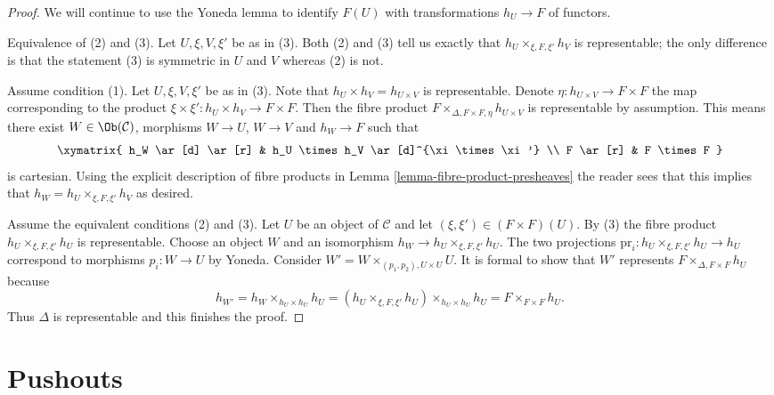 \begin{proof}
We will continue to use the Yoneda lemma to identify $F(U)$
with transformations $h_U \to F$ of functors.

\medskip\noindent
Equivalence of (2) and (3). Let $U, \xi, V, \xi'$ be as in (3).
Both (2) and (3) tell us exactly that $h_U \times_{\xi, F, \xi'} h_V$
is representable; the only difference is that the statement
(3) is symmetric in $U$ and $V$ whereas (2) is not.

\medskip\noindent
Assume condition (1). Let $U, \xi, V, \xi'$
be as in (3). Note that $h_U \times h_V = h_{U \times V}$ is representable.
Denote $\eta : h_{U \times V} \to F \times F$ the map
corresponding to the product $\xi \times \xi' : h_U \times h_V \to F \times F$.
Then the fibre product $F \times_{\Delta, F \times F, \eta} h_{U \times V}$
is representable by assumption. This means there exist
$W \in \Ob(\mathcal{C})$, morphisms
$W \to U$, $W \to V$ and $h_W \to F$ such that
$$
\xymatrix{
h_W \ar[d] \ar[r] & h_U \times h_V \ar[d]^{\xi \times \xi'} \\
F \ar[r] & F \times F
}
$$
is cartesian. Using the explicit description of fibre products
in Lemma \ref{lemma-fibre-product-presheaves} the reader sees that this
implies that $h_W = h_U \times_{\xi, F, \xi'} h_V$ as desired.

\medskip\noindent
Assume the equivalent conditions (2) and (3). Let $U$ be an object
of $\mathcal{C}$ and let $(\xi, \xi') \in (F \times F)(U)$.
By (3) the fibre product $h_U \times_{\xi, F, \xi'} h_U$ is
representable. Choose an object $W$ and an isomorphism
$h_W \to h_U \times_{\xi, F, \xi'} h_U$. The two projections
$\text{pr}_i : h_U \times_{\xi, F, \xi'} h_U \to h_U$
correspond to morphisms $p_i : W \to U$ by Yoneda. Consider
$W' = W \times_{(p_1, p_2), U \times U} U$. It is formal
to show that $W'$ represents $F \times_{\Delta, F \times F} h_U$
because
$$
h_{W'} = h_W \times_{h_U \times h_U} h_U
= (h_U \times_{\xi, F, \xi'} h_U) \times_{h_U \times h_U} h_U
= F \times_{F \times F} h_U.
$$
Thus $\Delta$ is representable and this finishes the proof.
\end{proof}









\section{Pushouts}
\label{section-pushouts}

